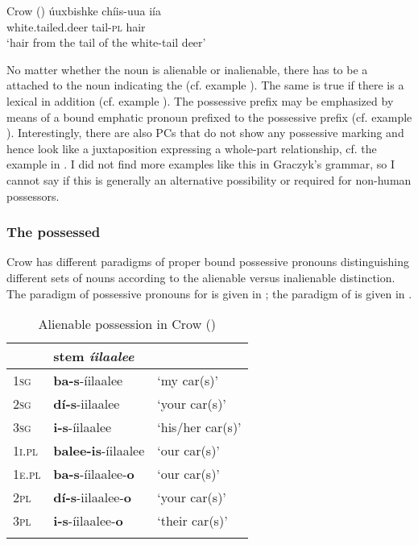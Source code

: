 \documentclass[output=paper]{LSP/langsci}
\begin{document}
\ea {}Crow (\citealt[236]{Graczyk2007}) \label{crowdeer}
\ex 
\gll úuxbishke            chíis-uua iía \\
white.tailed.deer tail-\textsc{pl}      hair \\
\glt `hair from the tail of the white-tail deer'
\z \z

No matter whether the  noun is alienable or inalienable, there has to be a  attached to the  noun indicating the  (cf. example ). The same is true if there is a lexical  in addition (cf. example ). The possessive prefix may be emphasized by means of a bound emphatic pronoun prefixed to the possessive prefix (cf. example ). Interestingly, there are also PCs that do not show any possessive marking and hence look like a juxtaposition expressing a whole-part relationship, cf. the example in . I did not find more examples like this in Graczyk's grammar, so I cannot say if this is generally an alternative possibility or required for non-human possessors.

\subsubsection{The possessed}
Crow has different paradigms of proper bound possessive pronouns distinguishing different sets of  nouns according to the alienable versus inalienable distinction. The paradigm of possessive pronouns for  is given in ; the paradigm of  is given in .

\begin{table}
\caption{Alienable possession in Crow (\citealt[53]{Graczyk2007})} \label{crowalienablepossession}
\begin{tabular}{ l l l}
\lsptoprule
& stem \textit{íilaalee} & \\
\midrule 	
\textsc{1sg} & \textbf{ba-s}-íilaalee	& `my car(s)' \\
 
\textsc{2sg} & \textbf{dí-s}-iilaalee & `your car(s)' \\
 
\textsc{3sg} & \textbf{i-s}-íilaalee & `his/her car(s)' \\
 
\textsc{1i.pl} & \textbf{balee-is}-íilaalee & `our car(s)' \\
 
\textsc{1e.pl} & \textbf{ba-s}-íilaalee-\textbf{o} & `our car(s)' \\
 
\textsc{2pl} & \textbf{dí-s}-iilaalee-\textbf{o} & `your car(s)' \\
 
\textsc{3pl} & \textbf{i-s}-íilaalee-\textbf{o} & `their car(s)' \\
\lspbottomrule
\end{tabular}
\end{table}
\end{document}
